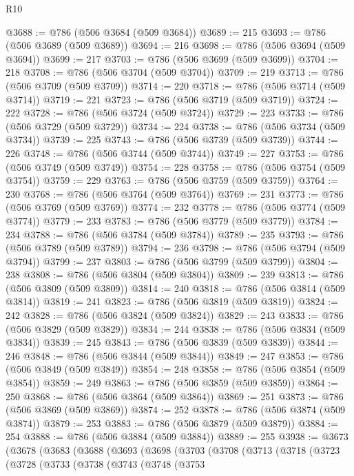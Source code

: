 \begin{lexlean}{R10}
\begin{coremodule}
@3688 := @786 (@506 @3684 (@509 @3684))
@3689 := 215
@3693 := @786 (@506 @3689 (@509 @3689))
@3694 := 216
@3698 := @786 (@506 @3694 (@509 @3694))
@3699 := 217
@3703 := @786 (@506 @3699 (@509 @3699))
@3704 := 218
@3708 := @786 (@506 @3704 (@509 @3704))
@3709 := 219
@3713 := @786 (@506 @3709 (@509 @3709))
@3714 := 220
@3718 := @786 (@506 @3714 (@509 @3714))
@3719 := 221
@3723 := @786 (@506 @3719 (@509 @3719))
@3724 := 222
@3728 := @786 (@506 @3724 (@509 @3724))
@3729 := 223
@3733 := @786 (@506 @3729 (@509 @3729))
@3734 := 224
@3738 := @786 (@506 @3734 (@509 @3734))
@3739 := 225
@3743 := @786 (@506 @3739 (@509 @3739))
@3744 := 226
@3748 := @786 (@506 @3744 (@509 @3744))
@3749 := 227
@3753 := @786 (@506 @3749 (@509 @3749))
@3754 := 228
@3758 := @786 (@506 @3754 (@509 @3754))
@3759 := 229
@3763 := @786 (@506 @3759 (@509 @3759))
@3764 := 230
@3768 := @786 (@506 @3764 (@509 @3764))
@3769 := 231
@3773 := @786 (@506 @3769 (@509 @3769))
@3774 := 232
@3778 := @786 (@506 @3774 (@509 @3774))
@3779 := 233
@3783 := @786 (@506 @3779 (@509 @3779))
@3784 := 234
@3788 := @786 (@506 @3784 (@509 @3784))
@3789 := 235
@3793 := @786 (@506 @3789 (@509 @3789))
@3794 := 236
@3798 := @786 (@506 @3794 (@509 @3794))
@3799 := 237
@3803 := @786 (@506 @3799 (@509 @3799))
@3804 := 238
@3808 := @786 (@506 @3804 (@509 @3804))
@3809 := 239
@3813 := @786 (@506 @3809 (@509 @3809))
@3814 := 240
@3818 := @786 (@506 @3814 (@509 @3814))
@3819 := 241
@3823 := @786 (@506 @3819 (@509 @3819))
@3824 := 242
@3828 := @786 (@506 @3824 (@509 @3824))
@3829 := 243
@3833 := @786 (@506 @3829 (@509 @3829))
@3834 := 244
@3838 := @786 (@506 @3834 (@509 @3834))
@3839 := 245
@3843 := @786 (@506 @3839 (@509 @3839))
@3844 := 246
@3848 := @786 (@506 @3844 (@509 @3844))
@3849 := 247
@3853 := @786 (@506 @3849 (@509 @3849))
@3854 := 248
@3858 := @786 (@506 @3854 (@509 @3854))
@3859 := 249
@3863 := @786 (@506 @3859 (@509 @3859))
@3864 := 250
@3868 := @786 (@506 @3864 (@509 @3864))
@3869 := 251
@3873 := @786 (@506 @3869 (@509 @3869))
@3874 := 252
@3878 := @786 (@506 @3874 (@509 @3874))
@3879 := 253
@3883 := @786 (@506 @3879 (@509 @3879))
@3884 := 254
@3888 := @786 (@506 @3884 (@509 @3884))
@3889 := 255
@3938 := @3673
    (@3678
      (@3683
        (@3688
          (@3693
            (@3698
              (@3703
                (@3708
                  (@3713
                    (@3718
                      (@3723
                        (@3728
                          (@3733
                            (@3738
                              (@3743
                                (@3748
                                  (@3753

\end{coremodule}
\end{lexlean}
